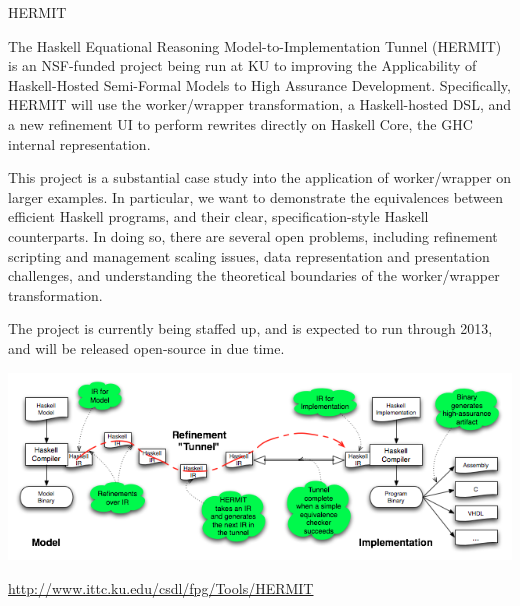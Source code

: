 \begin{hcarentry}{HERMIT}
\label{HERMIT}
\makeheader

The Haskell Equational Reasoning Model-to-Implementation Tunnel
(HERMIT) is an NSF-funded project being run at KU to improving the
Applicability of Haskell-Hosted Semi-Formal Models to High Assurance
Development. Specifically, HERMIT will use the worker/wrapper
transformation, a Haskell-hosted DSL, and a new refinement UI to
perform rewrites directly on Haskell Core, the GHC internal
representation.

This project is a substantial case study into the application of
worker/wrapper on larger examples. In particular, we want to
demonstrate the equivalences between efficient Haskell programs, and
their clear, specification-style Haskell counterparts. In doing so,
there are several open problems, including refinement scripting and
management scaling issues, data representation and presentation
challenges, and understanding the theoretical boundaries of the
worker/wrapper transformation.

The project is currently being staffed up, and is
expected to run through 2013, and will be released
open-source in due time.

\begin{center}
\includegraphics[width=1\textwidth]{html/HERMIT-tunnel.png}
\end{center}

\FurtherReading
  \url{http://www.ittc.ku.edu/csdl/fpg/Tools/HERMIT}
\end{hcarentry}
